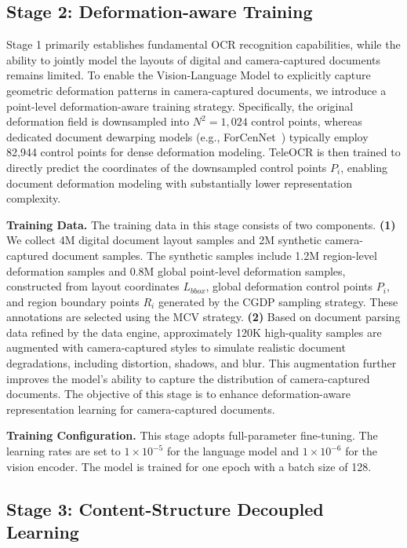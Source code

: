 \documentclass{fairmeta}
\begin{document}
\subsection{Stage 2: Deformation-aware Training}
Stage 1 primarily establishes fundamental OCR recognition capabilities, while the ability to jointly model the layouts of digital and camera-captured documents remains limited. To enable the Vision-Language Model to explicitly capture geometric deformation patterns in camera-captured documents, we introduce a point-level deformation-aware training strategy. Specifically, the original deformation field is downsampled into $N^2=1,024$ control points, whereas dedicated document dewarping models (e.g., ForCenNet~\cite{cai2025forcennet}) typically employ 82,944 control points for dense deformation modeling. TeleOCR is then trained to directly predict the coordinates of the downsampled control points $P_i$, enabling document deformation modeling with substantially lower representation complexity.

\textbf{Training Data.} The training data in this stage consists of two components. \textbf{(1)} We collect 4M digital document layout samples and 2M synthetic camera-captured document samples. The synthetic samples include 1.2M region-level deformation samples and 0.8M global point-level deformation samples, constructed from layout coordinates $L_{bbox}$, global deformation control points $P_i$, and region boundary points $R_i$ generated by the CGDP sampling strategy. These annotations are selected using the MCV strategy. \textbf{(2)} Based on document parsing data refined by the data engine, approximately 120K high-quality samples are augmented with camera-captured styles to simulate realistic document degradations, including distortion, shadows, and blur. This augmentation further improves the model's ability to capture the distribution of camera-captured documents. The objective of this stage is to enhance deformation-aware representation learning for camera-captured documents.

\textbf{Training Configuration.} This stage adopts full-parameter fine-tuning. The learning rates are set to $1\times10^{-5}$ for the language model and $1\times10^{-6}$ for the vision encoder. The model is trained for one epoch with a batch size of 128.

\subsection{Stage 3: Content-Structure Decoupled Learning}
\end{document}
